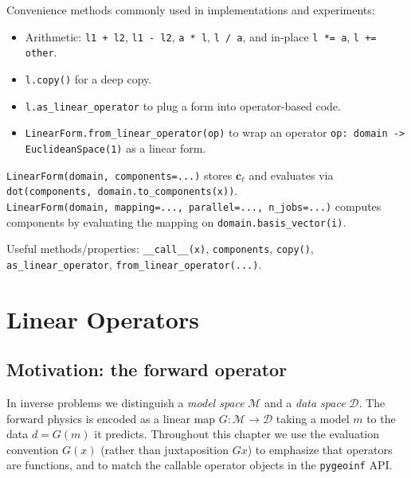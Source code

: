 \documentclass[11pt,twoside,openright]{book}
\theoremstyle{plain}
\theoremstyle{definition}
\theoremstyle{remark}
\newcommand{\modelspace}{\mathcal{M}}
\newcommand{\dataspace}{\mathcal{D}}
\begin{document}
Convenience methods commonly used in implementations and experiments:
\begin{itemize}
  \item Arithmetic: \texttt{l1 + l2}, \texttt{l1 - l2}, \texttt{a * l},
    \texttt{l / a}, and in-place \texttt{l *= a}, \texttt{l += other}.
  \item \texttt{l.copy()} for a deep copy.
  \item \texttt{l.as\_linear\_operator} to plug a form into operator-based code.
  \item \texttt{LinearForm.from\_linear\_operator(op)} to wrap an operator
    \texttt{op: domain -> EuclideanSpace(1)} as a linear form.
\end{itemize}

\begin{codebox}
\texttt{LinearForm(domain, components=...)} stores $\mathbf{c}_\ell$ and evaluates
via \texttt{dot(components, domain.to\_components(x))}.\\
\texttt{LinearForm(domain, mapping=..., parallel=..., n\_jobs=...)} computes
components by evaluating the mapping on \texttt{domain.basis\_vector(i)}.

\medskip
Useful methods/properties: \texttt{\_\_call\_\_(x)}, \texttt{components},
\texttt{copy()}, \texttt{as\_linear\_operator}, \texttt{from\_linear\_operator(...)}.
\end{codebox}


\chapter{Linear Operators}
\label{ch:linear-operators}

\section{Motivation: the forward operator}
\label{sec:operator-motivation}
In inverse problems we distinguish a \emph{model space} $\modelspace$ and a
\emph{data space} $\dataspace$. The forward physics is encoded as a linear map
$G: \modelspace \to \dataspace$ taking a model $m$ to the data $d = G(m)$ it
predicts.
Throughout this chapter we use the evaluation convention $G(x)$ (rather than
juxtaposition $Gx$) to emphasize that operators are functions, and to match the
callable operator objects in the \texttt{pygeoinf} API.
\end{document}
